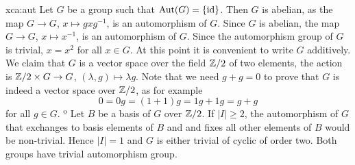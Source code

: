 







\begin{sol}{xca:aut}
    Let $G$ be a group such that $\operatorname{Aut}(G)=\{\operatorname{id}\}$. 
    Then $G$ is abelian, as the map $G\to G$, $x\mapsto gxg^{-1}$,   
    is an automorphism of $G$. Since $G$ is abelian, 
    the map $G\to G$, $x\mapsto x^{-1}$, is an automorphism of $G$. Since 
    the automorphism group of $G$ is trivial, 
    $x=x^2$ for all $x\in G$. 
    At this point it is convenient to write $G$ additively. We claim that 
    $G$ is a vector space
    over the field $\mathbb{Z}/2$ of two elements, the action
    is $\mathbb{Z}/2\times G\to G$, $(\lambda,g)\mapsto \lambda g$. Note that
    we need $g+g=0$ to prove that $G$ is indeed a vector space over $\mathbb{Z}/2$, as for example
    \[
    0=0g=(1+1)g=1g+1g=g+g
    \]
    for all $g\in G$. º
    Let $B$ be   
    a basis of $G$ over $\mathbb{Z}/2$. If $|I|\geq 2$, 
    the automorphism of $G$ that exchanges to basis elements of $B$ and  
    and fixes all other elements of $B$ would be non-trivial. Hence $|I|=1$ and 
    $G$ is either trivial of cyclic of order two. Both groups have trivial
    automorphism group. 
\end{sol}


